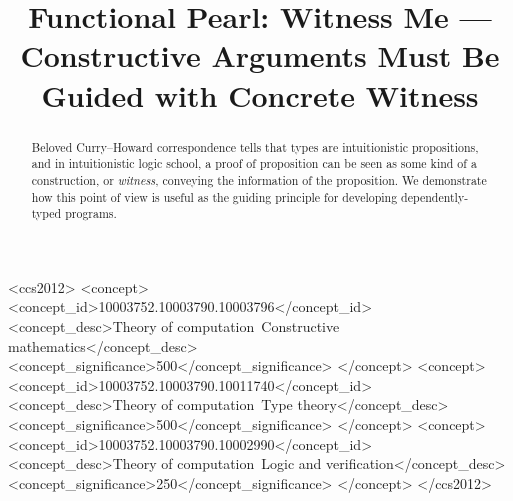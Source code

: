 \documentclass[sigplan,review]{acmart}
\begin{document}
\title[Functional Pearl: Witness Me]{Functional Pearl: Witness Me --- Constructive Arguments Must Be Guided with Concrete Witness}



\begin{abstract}
  
\end{abstract}

\begin{CCSXML}
<ccs2012>
   <concept>
       <concept_id>10003752.10003790.10003796</concept_id>
       <concept_desc>Theory of computation~Constructive mathematics</concept_desc>
       <concept_significance>500</concept_significance>
       </concept>
   <concept>
       <concept_id>10003752.10003790.10011740</concept_id>
       <concept_desc>Theory of computation~Type theory</concept_desc>
       <concept_significance>500</concept_significance>
       </concept>
   <concept>
       <concept_id>10003752.10003790.10002990</concept_id>
       <concept_desc>Theory of computation~Logic and verification</concept_desc>
       <concept_significance>250</concept_significance>
       </concept>
 </ccs2012>
\end{CCSXML}




\begin{abstract}
  Beloved Curry--Howard correspondence tells that types are intuitionistic propositions, and in intuitionistic logic school, a proof of proposition can be seen as some kind of a construction, or \emph{witness}, conveying the information of the proposition.
  We demonstrate how this point of view is useful as the guiding principle for developing dependently-typed programs.
\end{abstract}
\end{document}
